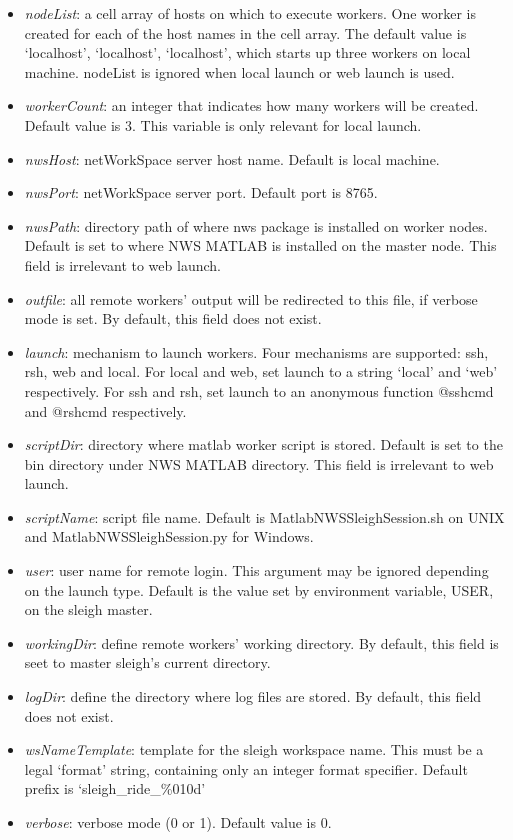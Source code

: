 \begin{list}{}{}
	 \begin{itemize}
	        \item \textit {nodeList}: a cell array of hosts on which to execute workers. One worker
		  is created for each of the host names in the cell array. The default value is {`localhost', `localhost', `localhost'},
		  which starts up three workers on local machine. nodeList is ignored when local launch or web launch is used. 
		\item \textit {workerCount}: an integer that indicates how many workers will be created. Default value is 3.
		  This variable is only relevant for local launch. 
		\item \textit {nwsHost}: netWorkSpace server host name. Default is local machine. 
		\item \textit {nwsPort}: netWorkSpace server port. Default port is 8765.
		\item \textit {nwsPath}: directory path of where nws package is installed on worker nodes. Default is set to where NWS MATLAB is installed on the master node. This field is irrelevant to web launch.
		\item \textit {outfile}: all remote workers' output will be redirected to this file, if verbose mode is set. By default, this field does not exist.
		\item \textit {launch}: mechanism to launch workers. Four mechanisms are supported: ssh, rsh, web and local. For local and web, set launch to a string
		  `local' and `web' respectively. For ssh and rsh, set launch to an anonymous function @sshcmd and @rshcmd respectively. 
		\item \textit {scriptDir}: directory where matlab worker script is stored. Default is set to the bin directory under NWS MATLAB directory. This field is irrelevant to web launch.
		\item \textit {scriptName}: script file name. Default is MatlabNWSSleighSession.sh on UNIX and MatlabNWSSleighSession.py for Windows.
		\item \textit {user}: user name for remote login. This argument may be ignored depending on the launch type. 
		  Default is the value set by environment variable, USER, on the sleigh master.
		\item \textit {workingDir}: define remote workers' working directory. By default, this field is seet to master sleigh's current directory. 		\item \textit {logDir}: define the directory where log files are stored. By default, this field does not exist. 
		\item \textit {wsNameTemplate}: template for the sleigh workspace name. This must be a legal `format' string, containing only an integer format specifier. Default prefix is `sleigh\_ride\_\%010d'
		\item \textit {verbose}: verbose mode (0 or 1). Default value is 0. 
    \end{itemize}
         	    

\end{list}
